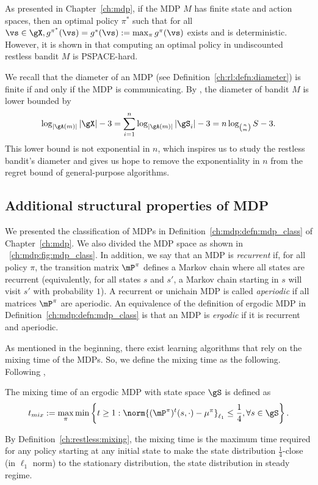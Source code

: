 As presented in Chapter~\ref{ch:mdp}, if the MDP $M$ has finite state and action spaces, then an optimal policy $\pi^*$ such that for all $\vs\in\gX, g^{\pi^*}(\vs)=g^*(\vs):=\max_{\pi}g^{\pi}(\vs)$ exists and is deterministic.
However, it is shown in \cite[Theorem~4]{papadimitriou1994complexity} that computing an optimal policy in undiscounted restless bandit $M$ is PSPACE-hard.

We recall that the diameter of an MDP (see Definition~\ref{ch:rl:defn:diameter}) is finite if and only if the MDP is communicating.
By \cite[Appendix A]{jaksch2010near}, the diameter of bandit $M$ is lower bounded by
\begin{equation*}
    \log_{|\gA(m)|}|\gX| -3 = \sum_{i=1}^{n}\log_{|\gA(m)|}|\gS_i| -3 =n\log_{{n \choose m}}S -3.
\end{equation*}
This lower bound is not exponential in $n$, which inspires us to study the restless bandit's diameter and gives us hope to remove the exponentiality in $n$ from the regret bound of general-purpose algorithms.

\subsection{Additional structural properties of MDP}
\label{ssec:mdp_params}

We presented the classification of MDPs in Definition~\ref{ch:mdp:defn:mdp_class} of Chapter~\ref{ch:mdp}.
We also divided the MDP space as shown in \figurename~\ref{ch:mdp:fig:mdp_class}.
In addition, we say that an MDP is \emph{recurrent} if, for all policy $\pi$, the transition matrix $\mP^\pi$ defines a Markov chain where all states are recurrent (equivalently, for all states $s$ and $s'$, a Markov chain starting in $s$ will visit $s'$ with probability $1$).
A recurrent or unichain MDP is called \emph{aperiodic} if all matrices $\mP^\pi$ are aperiodic.
An equivalence of the definition of ergodic MDP in Definition~\ref{ch:mdp:defn:mdp_class} is that an MDP is \emph{ergodic} if it is recurrent and aperiodic.

As mentioned in the beginning, there exist learning algorithms that rely on the mixing time of the MDPs.
So, we define the mixing time as the following.
Following \cite[Definition 5.1]{wei2020model},
\begin{defn}
    The mixing time of an ergodic MDP with state space $\gS$ is defined as
    \begin{align*}
        t_{mix} := \max_{\pi}\min\left\{ t\ge1 : \norm{(\mP^\pi)^t(s,\cdot) - \mu^\pi}_{\ell_1} \le \frac14, \forall s\in\gS\right\}.
    \end{align*}
    \label{ch:restless:mixing}
\end{defn}
By Definition~\ref{ch:restless:mixing}, the mixing time is the maximum time required for any policy starting at any initial state to make the state distribution $\frac14$-close (in $\ell_1$ norm) to the stationary distribution, the state distribution in steady regime.

